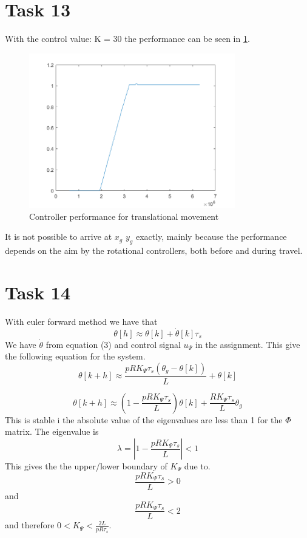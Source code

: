 \documentclass[a4paper,12pt,oneside,onecolumn]{article} %
\begin{document}
\section*{Task 13}
With the control value:
K = 30
the performance can be seen in \ref{13}.
\begin{figure}[H]
\begin{center}	
  \includegraphics[width = 0.8\textwidth]{task13.png}
  \caption{Controller performance for translational movement}\label{13}
 \end{center}
\end{figure}

It is not possible to arrive at $x_g$ $y_g$ exactly, mainly because the performance depends on the aim by the rotational controllers, both before and during travel. 
\section*{Task 14}


With euler forward method we have that
\begin{equation*}
\theta[h]\approx \theta[k]+\dot{\theta}[k]\tau_s
\end{equation*}
We have $\dot{\theta}$ from equation (3) and control signal $u_\Psi$ in the assignment. This give the following equation for the system.
\begin{equation*}
\theta[k+h]\approx  \frac{p R K_\Psi \tau_s(\theta_g-\theta[k])}{L}+\theta[k]
\end{equation*}

\begin{equation*}
\theta[k+h]\approx  (1-\frac{p R K_\Psi \tau_s}{L})\theta[k]+\frac{R K_\Psi \tau_s}{L}\theta_g
\end{equation*}
This is stable i the absolute value of the eigenvalues are less than 1 for the $\Phi$ matrix. The eigenvalue is
\begin{equation*}
\lambda = |1-\frac{p R K_\Psi \tau_s}{L}|<1
\end{equation*}
This gives the the upper/lower boundary of $K_\Psi$ due to.
\begin{equation*}
\frac{p R K_\Psi \tau_s}{L}>0
\end{equation*}
and
\begin{equation*}
\frac{p R K_\Psi \tau_s}{L}<2
\end{equation*}
and therefore $0<K_\Psi<\frac{2 L }{p R \tau_s}$.
\end{document}
